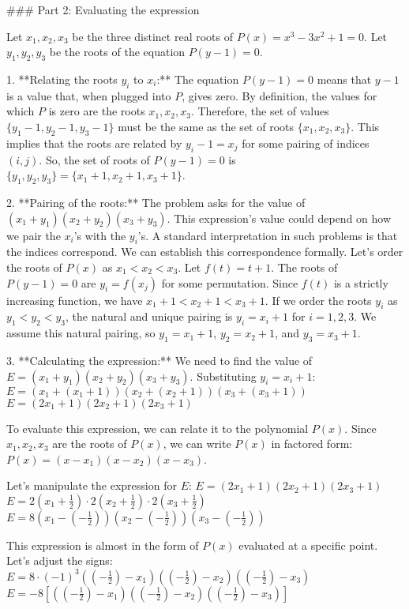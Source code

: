 ### Part 2: Evaluating the expression

Let $x_1, x_2, x_3$ be the three distinct real roots of $P(x) = x^3 - 3x^2 + 1 = 0$.
Let $y_1, y_2, y_3$ be the roots of the equation $P(y-1) = 0$.

1.  **Relating the roots $y_i$ to $x_i$:**
    The equation $P(y-1)=0$ means that $y-1$ is a value that, when plugged into $P$, gives zero. By definition, the values for which $P$ is zero are the roots $x_1, x_2, x_3$.
    Therefore, the set of values $\{y_1-1, y_2-1, y_3-1\}$ must be the same as the set of roots $\{x_1, x_2, x_3\}$.
    This implies that the roots are related by $y_i - 1 = x_j$ for some pairing of indices $(i, j)$.
    So, the set of roots of $P(y-1)=0$ is $\{y_1, y_2, y_3\} = \{x_1+1, x_2+1, x_3+1\}$.

2.  **Pairing of the roots:**
    The problem asks for the value of $(x_1 + y_1)(x_2 + y_2)(x_3 + y_3)$. This expression's value could depend on how we pair the $x_i$'s with the $y_i$'s. A standard interpretation in such problems is that the indices correspond. We can establish this correspondence formally. Let's order the roots of $P(x)$ as $x_1 < x_2 < x_3$.
    Let $f(t) = t+1$. The roots of $P(y-1)=0$ are $y_i = f(x_j)$ for some permutation. Since $f(t)$ is a strictly increasing function, we have $x_1+1 < x_2+1 < x_3+1$. If we order the roots $y_i$ as $y_1 < y_2 < y_3$, the natural and unique pairing is $y_i = x_i+1$ for $i=1, 2, 3$.
    We assume this natural pairing, so $y_1 = x_1+1$, $y_2 = x_2+1$, and $y_3 = x_3+1$.

3.  **Calculating the expression:**
    We need to find the value of $E = (x_1 + y_1)(x_2 + y_2)(x_3 + y_3)$.
    Substituting $y_i = x_i+1$:
    $E = (x_1 + (x_1+1))(x_2 + (x_2+1))(x_3 + (x_3+1))$
    $E = (2x_1 + 1)(2x_2 + 1)(2x_3 + 1)$

    To evaluate this expression, we can relate it to the polynomial $P(x)$.
    Since $x_1, x_2, x_3$ are the roots of $P(x)$, we can write $P(x)$ in factored form:
    $P(x) = (x-x_1)(x-x_2)(x-x_3)$.

    Let's manipulate the expression for $E$:
    $E = (2x_1 + 1)(2x_2 + 1)(2x_3 + 1)$
    $E = 2\left(x_1 + \frac{1}{2}\right) \cdot 2\left(x_2 + \frac{1}{2}\right) \cdot 2\left(x_3 + \frac{1}{2}\right)$
    $E = 8\left(x_1 - \left(-\frac{1}{2}\right)\right)\left(x_2 - \left(-\frac{1}{2}\right)\right)\left(x_3 - \left(-\frac{1}{2}\right)\right)$

    This expression is almost in the form of $P(x)$ evaluated at a specific point. Let's adjust the signs:
    $E = 8 \cdot (-1)^3 \left(\left(-\frac{1}{2}\right) - x_1\right)\left(\left(-\frac{1}{2}\right) - x_2\right)\left(\left(-\frac{1}{2}\right) - x_3\right)$
    $E = -8 \left[\left(\left(-\frac{1}{2}\right) - x_1\right)\left(\left(-\frac{1}{2}\right) - x_2\right)\left(\left(-\frac{1}{2}\right) - x_3\right)\right]$

